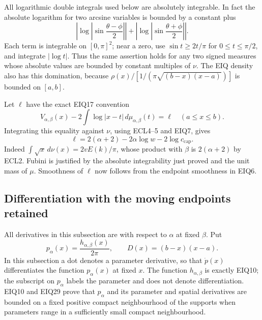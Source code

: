 \documentclass[11pt,a4paper]{article}
\begin{document}
All logarithmic double integrals used below are absolutely integrable.
In fact the absolute logarithm for two arcsine variables is bounded by
a constant plus
\[
\left|\log\left|\sin\frac{\theta-\phi}{2}\right|\right|
+\left|\log\left|\sin\frac{\theta+\phi}{2}\right|\right|.
\]
Each term is integrable on $[0,\pi]^2$; near a zero, use
$\sin t\geq 2t/\pi$ for $0\leq t\leq\pi/2$, and integrate
$|\log t|$. Thus the same assertion holds for any two signed
measures whose absolute values are bounded by constant multiples
of $\nu$. The EIQ density also has this domination, because
$\rho(x)/[1/(\pi\sqrt{(b-x)(x-a)})]$ is bounded on $[a,b]$.

Let $\ell$ have the exact EIQ17 convention
\[
V_{\alpha,\beta}(x)
-2\int\log|x-t|\,d\mu_{\alpha,\beta}(t)=\ell
\quad(a\leq x\leq b).
\]
Integrating this equality against $\nu$, using ECL4--5 and
EIQ7, gives
\begin{equation}\tag{ECL6}
\boxed{\displaystyle
\ell=2(\alpha+2)-2\alpha\log w-2\log c_{\mathrm{cap}}.}
\end{equation}
Indeed $\int\sqrt{x}\,d\nu(x)=2vE(k)/\pi$, whose product with
$\beta$ is $2(\alpha+2)$ by ECL2. Fubini is justified by the
absolute integrability just proved and the unit mass of $\mu$.
Smoothness of $\ell$ now follows from the endpoint smoothness in EIQ6.

\subsection{Differentiation with the moving endpoints retained}

All derivatives in this subsection are with respect to $\alpha$ at
fixed $\beta$. Put
\[
p_\alpha(x)=\frac{h_{\alpha,\beta}(x)}{2\pi},\qquad
D(x)=(b-x)(x-a).
\]
In this subsection a dot denotes a parameter derivative, so that
$\dot p(x)$ differentiates the function $p_\alpha(x)$ at fixed $x$.
The function $h_{\alpha,\beta}$ is exactly EIQ10; the subscript on
$p_\alpha$ labels the parameter and does not denote differentiation.
EIQ10 and EIQ29 prove that $p_\alpha$ and its parameter and spatial
derivatives are bounded on a fixed positive compact neighbourhood
of the supports when parameters range in a sufficiently small
compact neighbourhood.
\end{document}
